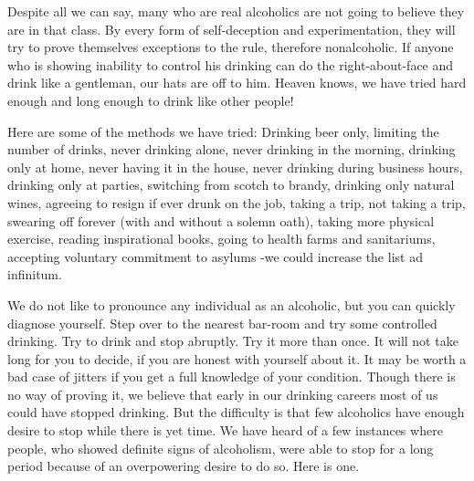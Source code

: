 \begin{biblechapter}

Despite all we can say, many who are real alcoholics are not going to believe they are in that class. 
By every form of self-deception and experimentation, 
they will try to prove themselves exceptions to the rule, therefore nonalcoholic. 
If anyone who is showing inability to control his drinking 
can do the right-about-face and drink like a gentleman, our hats are off to him. 
Heaven knows, we have tried hard enough and long enough to drink like other people!

Here are some of the methods we have tried: 
Drinking beer only, 
limiting the number of drinks, 
never drinking alone, 
never drinking in the morning, 
drinking only at home, 
never having it in the house, 
never drinking during business hours, 
drinking only at parties, 
switching from scotch to brandy, 
drinking only natural wines, 
agreeing to resign if ever drunk on the job, 
taking a trip, 
not taking a trip, 
swearing off forever (with and without a solemn oath), 
taking more physical exercise, 
reading inspirational books, 
going to health farms and sanitariums, 
accepting voluntary commitment to asylums 
-we could increase the list ad infinitum. 
\end{biblechapter}


\begin{biblechapter}

We do not like to pronounce any individual as an alcoholic, but you can quickly diagnose yourself. 
Step over to the nearest bar-room and try some controlled drinking. 
Try to drink and stop abruptly. 
Try it more than once. 
It will not take long for you to decide, if you are honest with yourself about it. 
It may be worth a bad case of jitters if you get a full knowledge of your condition.
Though there is no way of proving it, 
we believe that early in our drinking careers most of us could have stopped drinking. 
But the difficulty is that few alcoholics have enough desire to stop while there is yet time. 
We have heard of a few instances where people, who showed definite signs of alcoholism, 
were able to stop for a long period because of an overpowering desire to do so. 
Here is one.
\end{biblechapter}


